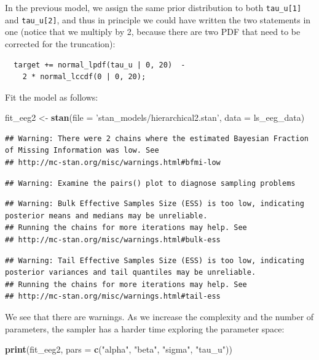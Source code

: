 \documentclass[12pt,]{krantz}
\newenvironment{Shaded}{\begin{snugshade}}{\end{snugshade}}
\newcommand{\KeywordTok}[1]{\textcolor[rgb]{0.13,0.29,0.53}{\textbf{#1}}}
\newcommand{\DataTypeTok}[1]{\textcolor[rgb]{0.13,0.29,0.53}{#1}}
\newcommand{\StringTok}[1]{\textcolor[rgb]{0.31,0.60,0.02}{#1}}
\newcommand{\NormalTok}[1]{#1}
\theoremstyle{definition}
\theoremstyle{definition}
\theoremstyle{definition}
\theoremstyle{remark}
\begin{document}
In the previous model, we assign the same prior distribution to both
\texttt{tau\_u{[}1{]}} and \texttt{tau\_u{[}2{]}}, and thus in principle
we could have written the two statements in one (notice that we multiply
by 2, because there are two PDF that need to be corrected for the
truncation):

\begin{verbatim}
  target += normal_lpdf(tau_u | 0, 20)  - 
    2 * normal_lccdf(0 | 0, 20);
\end{verbatim}

Fit the model as follows:

\begin{Shaded}
\begin{Highlighting}[]
\NormalTok{fit_eeg2 <-}\StringTok{ }\KeywordTok{stan}\NormalTok{(}\DataTypeTok{file =} \StringTok{'stan_models/hierarchical2.stan'}\NormalTok{, }
                 \DataTypeTok{data =}\NormalTok{ ls_eeg_data)}
\end{Highlighting}
\end{Shaded}

\begin{verbatim}
## Warning: There were 2 chains where the estimated Bayesian Fraction of Missing Information was low. See
## http://mc-stan.org/misc/warnings.html#bfmi-low
\end{verbatim}

\begin{verbatim}
## Warning: Examine the pairs() plot to diagnose sampling problems
\end{verbatim}

\begin{verbatim}
## Warning: Bulk Effective Samples Size (ESS) is too low, indicating posterior means and medians may be unreliable.
## Running the chains for more iterations may help. See
## http://mc-stan.org/misc/warnings.html#bulk-ess
\end{verbatim}

\begin{verbatim}
## Warning: Tail Effective Samples Size (ESS) is too low, indicating posterior variances and tail quantiles may be unreliable.
## Running the chains for more iterations may help. See
## http://mc-stan.org/misc/warnings.html#tail-ess
\end{verbatim}

We see that there are warnings. As we increase the complexity and the
number of parameters, the sampler has a harder time exploring the
parameter space:

\begin{Shaded}
\begin{Highlighting}[]
\KeywordTok{print}\NormalTok{(fit_eeg2, }\DataTypeTok{pars =} \KeywordTok{c}\NormalTok{(}\StringTok{"alpha"}\NormalTok{, }\StringTok{"beta"}\NormalTok{, }\StringTok{"sigma"}\NormalTok{, }\StringTok{"tau_u"}\NormalTok{))}
\end{Highlighting}
\end{Shaded}
\end{document}
